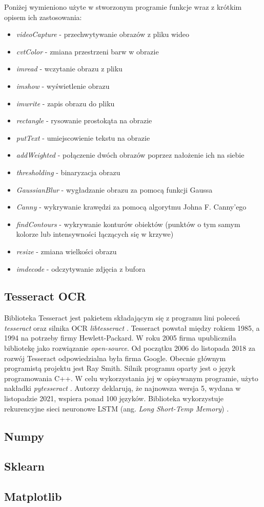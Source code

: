 Poniżej wymieniono użyte w stworzonym programie funkcje wraz z krótkim opisem ich zastosowania:
\begin{itemize}
    \item \textit{videoCapture} - przechwytywanie obrazów z pliku wideo
    \item \textit{cvtColor} - zmiana przestrzeni barw w obrazie
    \item \textit{imread} - wczytanie obrazu z pliku
    \item \textit{imshow} - wyświetlenie obrazu
    \item \textit{imwrite} - zapis obrazu do pliku
    \item \textit{rectangle} - rysowanie prostokąta na obrazie
    \item \textit{putText} - umiejscowienie tekstu na obrazie
    \item \textit{addWeighted} - połączenie dwóch obrazów poprzez nałożenie ich na siebie
    \item \textit{thresholding} - binaryzacja obrazu
    \item \textit{GaussianBlur} - wygładzanie obrazu za pomocą funkcji Gaussa
    \item \textit{Canny} - wykrywanie krawędzi za pomocą algorytmu Johna F. Canny'ego \cite{4767851}
    \item \textit{findContours} - wykrywanie konturów obiektów (punktów o tym samym kolorze lub intensywności łączących się w krzywe)
    \item \textit{resize} - zmiana wielkości obrazu
    \item \textit{imdecode} - odczytywanie zdjęcia z bufora
\end{itemize}

\subsection{Tesseract OCR}
Biblioteka Tesseract jest pakietem składającym się z programu lini poleceń \textit{tesseract} oraz silnika OCR \textit{libtesseract} \cite{tesseract}.
Tesseract powstał między rokiem 1985, a 1994 na potrzeby firmy Hewlett-Packard.
W roku 2005 firma upubliczniła bibliotekę jako rozwiązanie \textit{open-source}.
Od początku 2006 do listopada 2018 za rozwój Tesseract odpowiedzialna była firma Google.
Obecnie głównym programistą projektu jest Ray Smith.
Silnik programu oparty jest o język programowania C++.
W celu wykorzystania jej w opisywanym programie, użyto nakładki \textit{pytesseract} \cite{pytesseract}.
Autorzy deklarują, że najnowsza wersja 5, wydana w listopadzie 2021, wspiera ponad 100 języków.
Biblioteka wykorzystuje rekurencyjne sieci neuronowe LSTM (ang. \textit{Long Short-Temp Memory}) \cite{lstm}.

\subsection{Numpy}

\subsection{Sklearn}

\subsection{Matplotlib}
